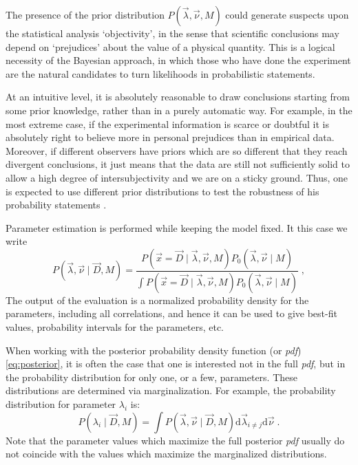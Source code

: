  The presence of the prior distribution $P(\vec{\lambda},\vec{\nu},M)$ could generate suspects upon the statistical analysis `objectivity', in the sense that scientific conclusions may depend on `prejudices' about the value of a physical quantity. This is a logical necessity of the Bayesian approach, in which those who have done the experiment are the natural candidates to turn likelihoods in probabilistic statements.

At an intuitive level, it is absolutely reasonable to draw conclusions starting from some prior knowledge, rather than in a purely automatic way. For example, in the most extreme case, if the experimental information is scarce or doubtful it is absolutely right to believe more in personal prejudices than in empirical data. Moreover, if different observers have priors which are so different that they reach divergent conclusions, it just means that the data are still not sufficiently solid to allow a high degree of intersubjectivity and we are on a sticky ground. Thus, one is expected to use different prior distributions to test the robustness of his probability statements \cite{bayesbook}.

 Parameter estimation is performed while keeping the model fixed. It this case we write
\begin{equation}P(\vec{\lambda},\vec{\nu}\mid\vec{D},M)=\frac{P(\vec{x}=\vec{D}\mid\vec{\lambda},\vec{\nu},M)P_0(\vec{\lambda},\vec{\nu}\mid M)}{\int P(\vec{x}=\vec{D}\mid\vec{\lambda},\vec{\nu},M)P_0(\vec{\lambda},\vec{\nu}\mid M)}\;,\label{eq:posterior}\end{equation}
The output of the evaluation is a normalized probability density for the parameters, including all correlations, and hence it can be used to give best-fit values, probability intervals for the parameters, etc.

When working with the posterior probability density function (or \emph{pdf}) \ref{eq:posterior}, it is often the case that one is interested not in the full \emph{pdf}, but in the probability distribution for only one, or a few, parameters. These distributions are determined via marginalization. For example, the probability distribution for parameter $\lambda_i$ is:
\begin{equation}P(\lambda_i\mid\vec{D},M)=\int P(\vec{\lambda},\vec{\nu}\mid\vec{D},M)\text{d}\vec{\lambda}_{i\neq j}\text{d}\vec{\nu}\;.\end{equation}
Note that the parameter values which maximize the full posterior \emph{pdf} usually do not coincide with the values which maximize the marginalized distributions.


